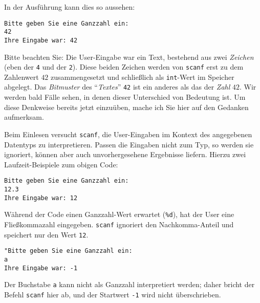In der Ausführung kann dies so aussehen:
\begin{cmdbox}
\begin{verbatim}
Bitte geben Sie eine Ganzzahl ein:
42
Ihre Eingabe war: 42
\end{verbatim}
\end{cmdbox}

\begin{hintbox}
Bitte beachten Sie: Die User-Eingabe war ein Text, bestehend aus zwei \emph{Zeichen} (eben der \texttt{4} und der \texttt{2}). Diese beiden Zeichen werden von \texttt{scanf} erst zu dem Zahlenwert $42$ zusammengesetzt und schließlich als \texttt{int}-Wert im Speicher abgelegt. Das \emph{Bitmuster} des \enquote{\emph{Textes}} \texttt{42} ist ein anderes als das der \emph{Zahl} $42$. Wir werden bald Fälle sehen, in denen dieser Unterschied von Bedeutung ist. Um diese Denkweise bereits jetzt einzuüben, mache ich Sie hier auf den Gedanken aufmerksam.
\end{hintbox}

Beim Einlesen versucht \texttt{scanf}, die User-Eingaben im Kontext des angegebenen Datentyps zu interpretieren. Passen die Eingaben nicht zum Typ, so werden sie \idR ignoriert, können aber auch unvorhergesehene Ergebnisse liefern. Hierzu zwei Laufzeit-Beispiele zum obigen Code:

\begin{cmdbox}
\begin{verbatim}
Bitte geben Sie eine Ganzzahl ein:
12.3
Ihre Eingabe war: 12
\end{verbatim}
\end{cmdbox}

Während der Code einen Ganzzahl-Wert erwartet (\texttt{\%d}), hat der User eine Fließkommazahl eingegeben. \texttt{scanf} ignoriert den Nachkomma-Anteil und speichert nur den Wert \texttt{12}.

\begin{cmdbox}
\begin{verbatim}
"Bitte geben Sie eine Ganzzahl ein:
a
Ihre Eingabe war: -1
\end{verbatim}
\end{cmdbox}
Der Buchstabe \texttt{a} kann nicht als Ganzzahl interpretiert werden; daher bricht der Befehl \texttt{scanf} hier ab, und der Startwert \texttt{-1} wird nicht überschrieben.

